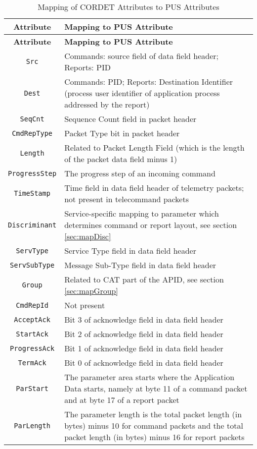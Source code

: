 \documentclass{pnp_article}
\begin{document}
\begin{longtable}{|c|>{\raggedright\arraybackslash}p{11cm}|}
\caption{Mapping of CORDET Attributes to PUS Attributes}\label{tab:pcktAttPus} \\
\hline
\rowcolor{light-gray}
\textbf{Attribute} & \textbf{Mapping to PUS Attribute} \\
\hline\hline
\endfirsthead
\rowcolor{light-gray}
\textbf{Attribute} & \textbf{Mapping to PUS Attribute} \\
\hline\hline
\endhead
\texttt{Src} & Commands: source field of data field header; Reports: PID \\
\hline
\texttt{Dest} & Commands: PID; Reports: Destination Identifier (process user identifier of application process addressed by the report)  \\
\hline
\texttt{SeqCnt} & Sequence Count field in packet header \\
\hline
\texttt{CmdRepType} & Packet Type bit in packet header \\
\hline
\texttt{Length} & Related to Packet Length Field (which is the length of the packet data field minus 1) \\
\hline
\texttt{ProgressStep} & The progress step of an incoming command \\
\hline

\texttt{TimeStamp} & Time field in data field header of telemetry packets; not present in telecommand packets \\
\hline
\texttt{Discriminant} & Service-specific mapping to parameter which determines command or report layout, see section \ref{sec:mapDisc} \\
\hline
\texttt{ServType} & Service Type field in data field header \\
\hline
\texttt{ServSubType} & Message Sub-Type field in data field header \\
\hline
\texttt{Group} & Related to CAT part of the APID, see section \ref{sec:mapGroup} \\
\hline
\texttt{CmdRepId} & Not present \\
\hline
\texttt{AcceptAck} & Bit 3 of acknowledge field in data field header \\
\hline
\texttt{StartAck} & Bit 2 of acknowledge field in data field header \\
\hline
\texttt{ProgressAck} & Bit 1 of acknowledge field in data field header \\
\hline
\texttt{TermAck} & Bit 0 of acknowledge field in data field header \\
\hline
\texttt{ParStart} & The parameter area starts where the Application Data starts, namely at byte 11 of a command packet and at byte 17 of a report packet \\
\hline
\texttt{ParLength} & The parameter length is the total packet length (in bytes) minus 10 for command packets and the total packet length (in bytes) minus 16 for report packets \\
\hline
\end{longtable}  
\end{document}
